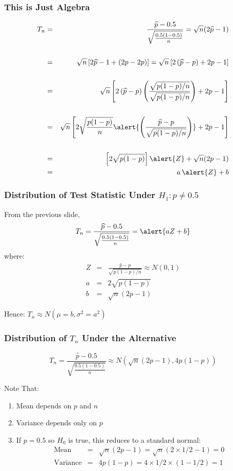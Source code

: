 \documentclass[handout]{beamer}
\begin{document}
\begin{frame}
\frametitle{This is Just Algebra}
\small
	\begin{eqnarray*}
	T_n &=&\frac{\widehat{p} - 0.5}{\sqrt{\frac{0.5(1-0.5)}{n}}} =\sqrt{n}(2\widehat{p} - 1)\\ \\
	&=& \sqrt{n} \left[2\widehat{p} -1 + (2p -2p)\right] = \sqrt{n}\left[ 2\left(\widehat{p} - p\right) + 2p -1\right]\\ \\
	&=& \sqrt{n}\left[ 2\left(\widehat{p} - p\right) \left(\frac{\sqrt{p(1-p)/n}}{\sqrt{p(1-p)/n}}\right) + 2p -1\right]\\ \\
		&=& \sqrt{n}\left[ 2\sqrt{\frac{p(1-p)}{n}} \alert{\left(\frac{\widehat{p} - p}{\sqrt{p(1-p)/n}}\right)} + 2p -1\right]\\ \\
		&=& \left[2\sqrt{p(1-p)}\right] \alert{Z} + \sqrt{n}(2p -1)\\
		&=& a\, \alert{Z} + b
\end{eqnarray*}
\end{frame}
\begin{frame}
\frametitle{Distribution of Test Statistic Under $H_1\colon p \neq 0.5$ }

From the previous slide,
	$$T_n =\frac{\widehat{p} - 0.5}{\sqrt{\frac{0.5(1-0.5)}{n}}} = \alert{a Z + b}$$
where:
	\begin{eqnarray*}
		Z &=& \frac{\widehat{p} - p}{\sqrt{p(1-p)/n}} \approx N(0,1)\\ 
		a &=& 2\sqrt{p(1-p)}\\ 
		b &=& \sqrt{n}(2p -1) 
	\end{eqnarray*}

\vspace{1em}
\alert{Hence: $T_n \approx N(\mu = b, \sigma^2 = a^2)$}
\end{frame}
\begin{frame}[c]\frametitle{Distribution of $T_n$ Under the Alternative}
    
    $$\boxed{T_n =\frac{\widehat{p} - 0.5}{\sqrt{\frac{0.5(1-0.5)}{n}}} \approx N\left(\sqrt{n}(2p-1), 4p(1-p) \right)}$$

\begin{block}
	{Note That:}
	\begin{enumerate}
		\item Mean depends on $p$ and $n$
		\item Variance depends only on $p$
		\item If $p=0.5$ so $H_0$ is true, this reduces to a standard normal:
		\begin{eqnarray*}
		\mbox{Mean} &=&  \sqrt{n}(2p-1) = \sqrt{n}(2\times 1/2 - 1) = 0\\
			\mbox{Variance} &=& 4p(1-p) = 4 \times 1/2 \times (1 - 1/2) = 1\\
		\end{eqnarray*}
	\end{enumerate}
\end{block}

\end{frame}
\end{document}
